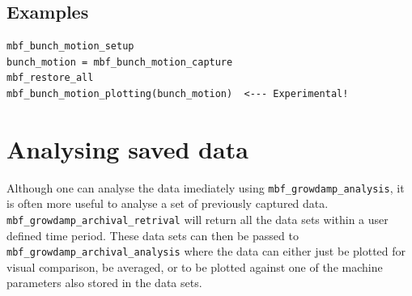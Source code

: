\documentclass{report}
\begin{document}
\section{Examples}

\begin{verbatim}
mbf_bunch_motion_setup
bunch_motion = mbf_bunch_motion_capture
mbf_restore_all
mbf_bunch_motion_plotting(bunch_motion)  <--- Experimental!
\end{verbatim}

\chapter{Analysing saved data}
Although one can analyse the data imediately using \verb|mbf_growdamp_analysis|, it is often more useful to analyse a set of previously captured data. \verb|mbf_growdamp_archival_retrival| will return all the data sets within a user defined time period. These data sets can then be passed to \verb|mbf_growdamp_archival_analysis| where the data can either just be plotted for visual comparison, be averaged, or to be plotted against one of the machine parameters also stored in the data sets.
\end{document}
